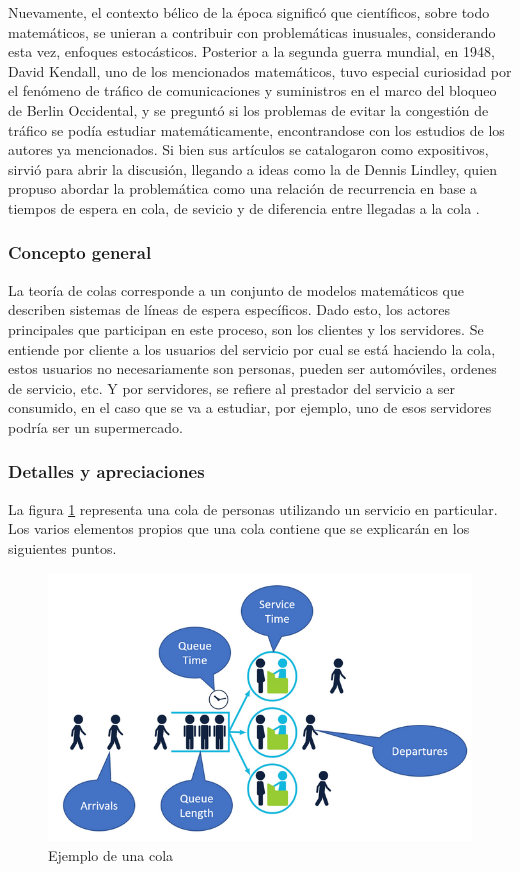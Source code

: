 \newline \newline
Nuevamente, el contexto bélico de la época significó que científicos, sobre todo matemáticos, se unieran a contribuir con problemáticas inusuales, considerando esta vez, enfoques estocásticos. Posterior a la segunda guerra mundial, en 1948, David Kendall, uno de los mencionados matemáticos, tuvo especial curiosidad por el fenómeno de tráfico de comunicaciones y suministros en el marco del bloqueo de Berlin Occidental, y se preguntó si los problemas de evitar la congestión de tráfico se podía estudiar matemáticamente, encontrandose con los estudios de los autores ya mencionados. Si bien sus artículos se catalogaron como expositivos, sirvió para abrir la discusión, llegando a ideas como la de Dennis Lindley, quien propuso abordar la problemática como una relación de recurrencia en base a tiempos de espera en cola, de sevicio y de diferencia entre llegadas a la cola \citep{hlynka2017}.

\subsubsection{Concepto general} %

\noindent La teoría de colas corresponde a un conjunto de modelos matemáticos que describen sistemas de líneas de espera específicos. Dado esto, los actores principales que participan en este proceso, son los clientes y los servidores. Se entiende por cliente a los usuarios del servicio por cual se está haciendo la cola, estos usuarios no necesariamente son personas, pueden ser automóviles, ordenes de servicio, etc. Y por servidores, se refiere al prestador del servicio a ser consumido, en el caso que se va a estudiar, por ejemplo, uno de esos servidores podría ser un supermercado.

\subsubsection{Detalles y apreciaciones} %

\noindent La figura \ref{figtc} representa una cola de personas utilizando un servicio en particular. Los varios elementos propios que una cola contiene que se explicarán en los siguientes puntos.

    \begin{figure}[H]
        \centering
        \includegraphics[width=.75\textwidth]{images/Queueing-Example.PNG}
        \caption{Ejemplo de una cola\citep{unknownauthor2021}}
        \label{figtc}
    \end{figure} 
    
